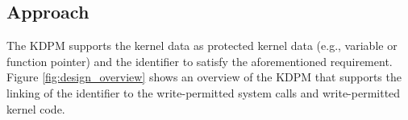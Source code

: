 






\subsection{Approach}

The KDPM supports the kernel data as protected kernel data (e.g., variable or
function pointer) and the identifier to satisfy the aforementioned requirement.
%
Figure \ref{fig:design_overview} shows an overview of 
%
the KDPM that supports 
the linking of the identifier to the write-permitted system calls and
write-permitted kernel code.
%

